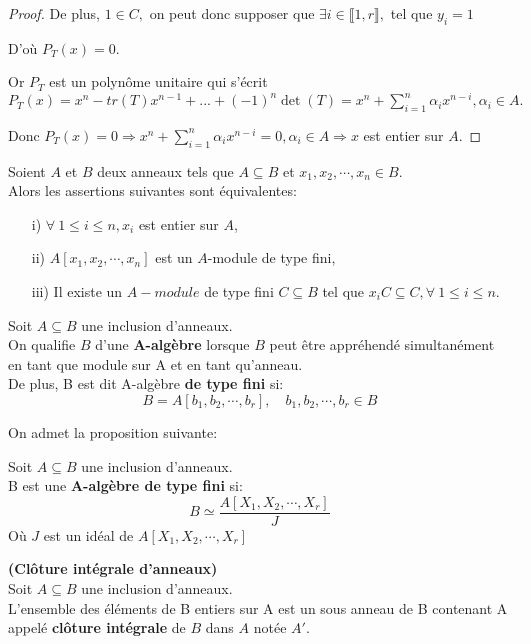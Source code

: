 \begin{proof}
	De plus, $1\in C,$ on peut donc supposer que $\exists i\in \llbracket 1, r \rrbracket ,$ tel que $y_{i}=1$
	
	D'où $P_{T}(x)=0.$
	
	Or $P_{T}$ est un polynôme unitaire qui s'écrit\\ $P_{T}(x)=x^{n}-tr(T)x^{n-1}+...+(-1)^{n}\det
	(T)=x^{n}+\sum\limits_{i=1}^{n}\alpha _{i}x^{n-i},\alpha _{i}\in A.$
	
	Donc $P_{T}(x)=0\Rightarrow x^{n}+\sum\limits_{i=1}^{n}\alpha
	_{i}x^{n-i}=0,\alpha _{i}\in A\Rightarrow x$ est entier sur $A.$
	
\end{proof}
\begin{moncorollaire}
	Soient $A$ et $B$ deux anneaux tels que $A \subseteq  B$ et $x_1, x_2, \cdots, x_n \in B$.\\
	Alors les assertions suivantes sont équivalentes:\\
	\begin{enumerate}
		\item[i)]$\forall \ 1 \leqslant i \leqslant n, x_i$ est entier sur $A$,
		\item[ii)]$A[x_1, x_2, \cdots, x_n]$ est un $A$-module de type fini,
		\item[iii)]Il existe un $A-module$ de type fini $C \subseteq  B$ tel que $x_i C \subseteq  C, \forall \ 1 \leqslant i \leqslant n$.
	\end{enumerate}
\end{moncorollaire}
\newpage
\begin{madefinition}
	Soit $A \subseteq B$ une inclusion d'anneaux.\\
	On qualifie $B$ d'une \textbf{A-algèbre} lorsque $B$ peut être appréhendé simultanément en tant que module sur A et en tant qu'anneau.\\
	De plus, B est dit A-algèbre \textbf{de type fini} si: 
	\[ B = A[b_1, b_2, \cdots, b_r] ,  \quad b_1, b_2, \cdots, b_r \in B \]	
\end{madefinition}
On admet la proposition suivante:
\begin{maproposition}
	Soit $A \subseteq B$ une inclusion d'anneaux.\\
	B est une \textbf{A-algèbre de type fini} si:
	\[ B \simeq \dfrac{A[X_1, X_2, \cdots, X_r]}{J} \]
	Où $J$ est un idéal de $A[X_1, X_2, \cdots, X_r]$
\end{maproposition}
\begin{moncorollaire}\textbf{(Clôture intégrale d'anneaux)}\cite{2}\\
	Soit $A \subseteq B$ une inclusion d'anneaux.\\
	L'ensemble des éléments de B entiers sur A est un sous anneau de B contenant A appelé \textbf{clôture intégrale} de $B$ dans $A$ notée $A'$.
\end{moncorollaire}
